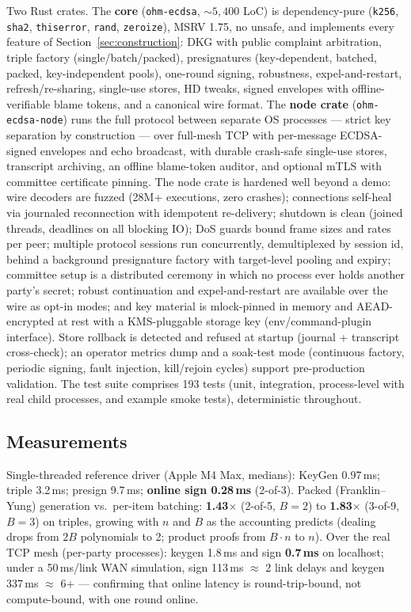 \documentclass[11pt]{article}
\theoremstyle{plain}
\theoremstyle{definition}
\theoremstyle{remark}
\begin{document}
Two Rust crates. The \textbf{core} (\texttt{ohm-ecdsa}, ${\sim}5{,}400$ LoC) is dependency-pure (\texttt{k256}, \texttt{sha2}, \texttt{thiserror}, \texttt{rand}, \texttt{zeroize}), MSRV 1.75, no unsafe, and implements every feature of Section~\ref{sec:construction}: DKG with public complaint arbitration, triple factory (single/batch/packed), presignatures (key-dependent, batched, packed, key-independent pools), one-round signing, robustness, expel-and-restart, refresh/re-sharing, single-use stores, HD tweaks, signed envelopes with offline-verifiable blame tokens, and a canonical wire format. The \textbf{node crate} (\texttt{ohm-ecdsa-node}) runs the full protocol between separate OS processes --- strict key separation by construction --- over full-mesh TCP with per-message ECDSA-signed envelopes and echo broadcast, with durable crash-safe single-use stores, transcript archiving, an offline blame-token auditor, and optional mTLS with committee certificate pinning. The node crate is hardened well beyond a demo: wire decoders are fuzzed (28M+ executions, zero crashes); connections self-heal via journaled reconnection with idempotent re-delivery; shutdown is clean (joined threads, deadlines on all blocking IO); DoS guards bound frame sizes and rates per peer; multiple protocol sessions run concurrently, demultiplexed by session id, behind a background presignature factory with target-level pooling and expiry; committee setup is a distributed ceremony in which no process ever holds another party's secret; robust continuation and expel-and-restart are available over the wire as opt-in modes; and key material is mlock-pinned in memory and AEAD-encrypted at rest with a KMS-pluggable storage key (env/command-plugin interface). Store rollback is detected and refused at startup (journal + transcript cross-check); an operator metrics dump and a soak-test mode (continuous factory, periodic signing, fault injection, kill/rejoin cycles) support pre-production validation. The test suite comprises 193 tests (unit, integration, process-level with real child processes, and example smoke tests), deterministic throughout.

\subsection{Measurements}

Single-threaded reference driver (Apple M4 Max, medians): KeyGen 0.97\,ms; triple 3.2\,ms; presign 9.7\,ms; \textbf{online sign 0.28\,ms} (2-of-3). Packed (Franklin--Yung) generation vs.\ per-item batching: \textbf{1.43$\times$} (2-of-5, $B{=}2$) to \textbf{1.83$\times$} (3-of-9, $B{=}3$) on triples, growing with $n$ and $B$ as the accounting predicts (dealing drops from $2B$ polynomials to 2; product proofs from $B{\cdot}n$ to $n$). Over the real TCP mesh (per-party processes): keygen 1.8\,ms and sign \textbf{0.7\,ms} on localhost; under a 50\,ms/link WAN simulation, sign 113\,ms $\approx$ 2 link delays and keygen 337\,ms $\approx$ 6+ --- confirming that online latency is round-trip-bound, not compute-bound, with one round online.
\end{document}
